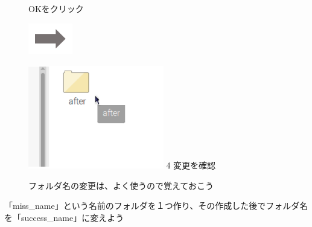 \documentclass[a4paper,12pt]{jarticle}
\begin{document}
\begin{figure}[ht]
\begin{minipage}{6.973cm}
    OKをクリック
  \end{minipage}
  \includegraphics[width=1.919cm,height=1.365cm]{textbook-img053.png}
  \begin{minipage}{5.751cm}
    \includegraphics[width=5.92cm,height=4.51cm]{textbook-img056.png}
    4 変更を確認
  \end{minipage}
  \centering

  \begin{minipage}{5.751cm}
    フォルダ名の変更は、よく使うので覚えておこう
  \end{minipage}
\end{figure}


\theQuestion\label{Q:hasAnswer02-3}

「miss\_name」という名前のフォルダを１つ作り、その作成した後でフォルダ名を「success\_name」に変えよう
\end{document}
